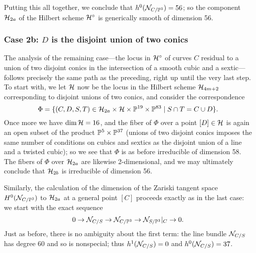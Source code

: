 Putting this all together, we conclude that $h^0({\mathcal N}_{C/{\mathbb P}^3}) = 56$; so the component ${\cal H}_{2a}$ of the Hilbert scheme ${\cal H}^\circ$ is generically smooth of dimension 56.

\subsubsection{Case 2b: $D$ is the disjoint union of two conics}

The analysis of the remaining case---the locus in ${\cal H}^\circ$ of curves $C$ residual to a union of two disjoint conics in the intersection of a smooth cubic and a sextic---follows precisely the same path as the preceding, right up until the very last step. To start with, we let ${\cal H}$ now be the locus in the Hilbert scheme ${\cal H}_{4m+2}$ corresponding to disjoint unions of two conics, and consider the correspondence
$$
\Phi = \{(C,D,S,T) \in {\cal H}_{2a} \times {\cal H} \times {\mathbb P}^{19} \times {\mathbb P}^{83} \mid S \cap T = C \cup D \}.
$$
Once more we have $\dim {\cal H} = 16$, and the fiber of $\Phi$ over a point $[D] \in {\cal H}$ is again an open subset of the product ${\mathbb P}^5 \times {\mathbb P}^{37}$ (unions of two disjoint conics imposes the same number of conditions on cubics and sextics as the disjoint union of a line and a twisted cubic); so we see that $\Phi$ is as before irreducible of dimension 58. The fibers of $\Phi$ over $ {\cal H}_{2a}$ are likewise 2-dimensional, and we may ultimately conclude that ${\cal H}_{2b}$ is irreducible of dimension 56.

Similarly, the calculation of the dimension of the Zariski tangent space $H^0({\mathcal N}_{C/{\mathbb P}^3})$ to ${\cal H}_{2a}$ at a general point $[C]$ proceeds exactly as in the last case: we start with the exact sequence
$$
0 \to {\mathcal N}_{C/S} \to {\mathcal N}_{C/{\mathbb P}^3} \to {\mathcal N}_{S/{\mathbb P}^3}|_C \to 0.
$$ 
Just as before, there is no ambiguity about the first term: the line bundle ${\mathcal N}_{C/S}$ has degree 60 and so is nonspecial; thus $h^1({\mathcal N}_{C/S}) = 0$ and $h^0({\mathcal N}_{C/S}) = 37$.

